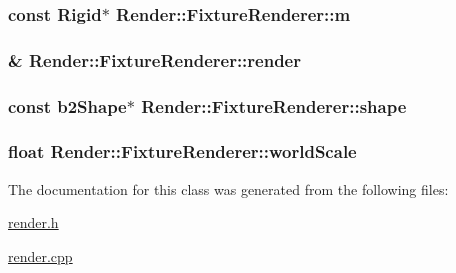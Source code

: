 \subsubsection[{m}]{\setlength{\rightskip}{0pt plus 5cm}const {\bf Rigid}$\ast$ Render\+::\+Fixture\+Renderer\+::m\hspace{0.3cm}{\ttfamily [protected]}}\label{classRender_1_1FixtureRenderer_af9c0ad74bd3b54e9112121221810fc9b}
\hypertarget{classRender_1_1FixtureRenderer_af093f28a7ea2cd706322636f5795098a}{}
\subsubsection[{render}]{\& Render\+::\+Fixture\+Renderer\+::render\hspace{0.3cm}{\ttfamily [protected]}}\label{classRender_1_1FixtureRenderer_af093f28a7ea2cd706322636f5795098a}
\hypertarget{classRender_1_1FixtureRenderer_a8332522b3b8a10f5f2772e5ca629cecb}{}
\subsubsection[{shape}]{\setlength{\rightskip}{0pt plus 5cm}const b2\+Shape$\ast$ Render\+::\+Fixture\+Renderer\+::shape\hspace{0.3cm}{\ttfamily [protected]}}\label{classRender_1_1FixtureRenderer_a8332522b3b8a10f5f2772e5ca629cecb}
\hypertarget{classRender_1_1FixtureRenderer_a0a11c59dbc0b65653c048e8900fdc12c}{}
\subsubsection[{world\+Scale}]{\setlength{\rightskip}{0pt plus 5cm}float Render\+::\+Fixture\+Renderer\+::world\+Scale\hspace{0.3cm}{\ttfamily [protected]}}\label{classRender_1_1FixtureRenderer_a0a11c59dbc0b65653c048e8900fdc12c}


The documentation for this class was generated from the following files\+:\begin{DoxyCompactItemize}
\item 
\hyperlink{render_8h}{render.\+h}\item 
\hyperlink{render_8cpp}{render.\+cpp}\end{DoxyCompactItemize}
